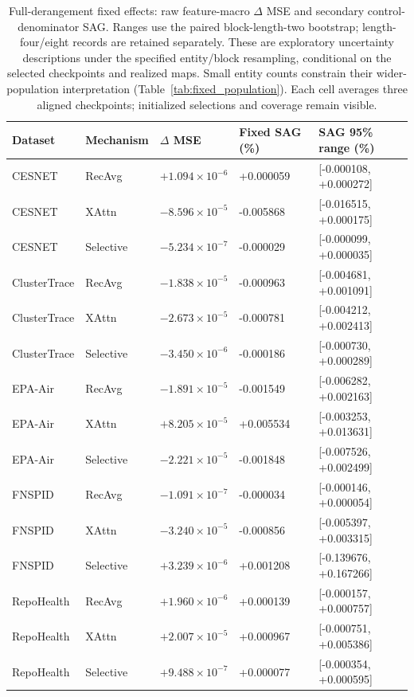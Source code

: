 \begin{table}[htbp]
\centering\footnotesize
\setlength{\tabcolsep}{4pt}
\caption{Full-derangement fixed effects: raw feature-macro $\Delta$ MSE and secondary control-denominator SAG. Ranges use the paired block-length-two bootstrap; length-four/eight records are retained separately. These are exploratory uncertainty descriptions under the specified entity/block resampling, conditional on the selected checkpoints and realized maps. Small entity counts constrain their wider-population interpretation (Table~\ref{tab:fixed_population}). Each cell averages three aligned checkpoints; initialized selections and coverage remain visible.}
\label{tab:fixed_full}
\begin{tabular}{lllll}
\toprule
Dataset & Mechanism & $\Delta$ MSE & Fixed SAG (\%) & SAG 95\% range (\%)\\
\midrule
CESNET & RecAvg & $+1.094\times10^{-6}$ & +0.000059 & [-0.000108, +0.000272]\\
CESNET & XAttn & $-8.596\times10^{-5}$ & -0.005868 & [-0.016515, +0.000175]\\
CESNET & Selective & $-5.234\times10^{-7}$ & -0.000029 & [-0.000099, +0.000035]\\
ClusterTrace & RecAvg & $-1.838\times10^{-5}$ & -0.000963 & [-0.004681, +0.001091]\\
ClusterTrace & XAttn & $-2.673\times10^{-5}$ & -0.000781 & [-0.004212, +0.002413]\\
ClusterTrace & Selective & $-3.450\times10^{-6}$ & -0.000186 & [-0.000730, +0.000289]\\
EPA-Air & RecAvg & $-1.891\times10^{-5}$ & -0.001549 & [-0.006282, +0.002163]\\
EPA-Air & XAttn & $+8.205\times10^{-5}$ & +0.005534 & [-0.003253, +0.013631]\\
EPA-Air & Selective & $-2.221\times10^{-5}$ & -0.001848 & [-0.007526, +0.002499]\\
FNSPID & RecAvg & $-1.091\times10^{-7}$ & -0.000034 & [-0.000146, +0.000054]\\
FNSPID & XAttn & $-3.240\times10^{-5}$ & -0.000856 & [-0.005397, +0.003315]\\
FNSPID & Selective & $+3.239\times10^{-6}$ & +0.001208 & [-0.139676, +0.167266]\\
RepoHealth & RecAvg & $+1.960\times10^{-6}$ & +0.000139 & [-0.000157, +0.000757]\\
RepoHealth & XAttn & $+2.007\times10^{-5}$ & +0.000967 & [-0.000751, +0.005386]\\
RepoHealth & Selective & $+9.488\times10^{-7}$ & +0.000077 & [-0.000354, +0.000595]\\
\bottomrule
\end{tabular}
\end{table}

